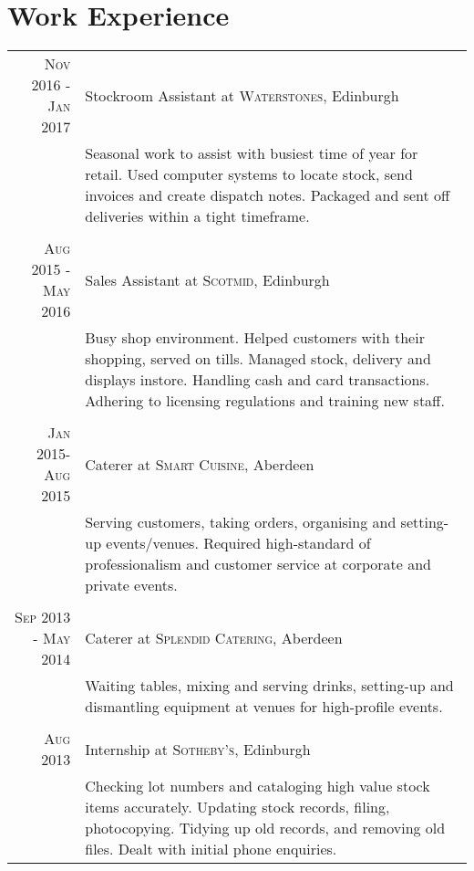 \documentclass[12pt, a4paper]{article}
\begin{document}
\section{Work Experience}
\setlength\tabcolsep{4pt}\centering
\begin{tabular}{r|p{11cm}}

\textsc{Nov 2016 - Jan 2017} & Stockroom Assistant at \textsc{Waterstones}, Edinburgh \\
& \small{Seasonal work to assist with busiest time of year for retail. Used computer systems to locate stock, send invoices and create dispatch notes. Packaged and sent off deliveries within a tight timeframe.} \\
\multicolumn{2}{c}{} \\

\textsc{Aug 2015 - May 2016} & Sales Assistant at \textsc{Scotmid}, Edinburgh \\
& \small{Busy shop environment. Helped customers with their shopping, served on tills. Managed stock, delivery and displays instore. Handling cash and card transactions. Adhering to licensing regulations and training new staff.} \\
\multicolumn{2}{c}{} \\

\textsc{Jan 2015-Aug 2015} & Caterer at \textsc{Smart Cuisine}, Aberdeen \emph{}\\
& \small{Serving customers, taking orders, organising and setting-up events/venues. Required high-standard of professionalism and customer service at corporate and private events.}\\
\multicolumn{2}{c}{} \\

\textsc{Sep 2013 - May 2014} & Caterer at \textsc{Splendid Catering}, Aberdeen \emph{}\\
& \small{Waiting tables, mixing and serving drinks, setting-up and dismantling equipment at venues for high-profile events.}\\
\multicolumn{2}{c}{} \\

\textsc{Aug 2013} & Internship at \textsc{Sotheby's}, Edinburgh \emph{}\\
& \small{Checking lot numbers and cataloging high value stock items accurately. Updating stock records, filing, photocopying. Tidying up old records, and removing old files. Dealt with initial phone enquiries.}\\
\end{tabular}
\end{document}
